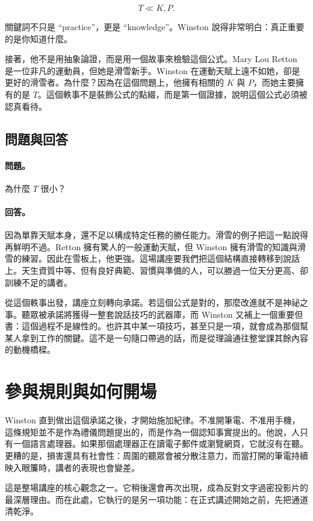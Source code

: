\begin{equation}
T \ll K,P.
\end{equation}

關鍵詞不只是 ``practice''，更是 ``knowledge''。Winston 說得非常明白：真正重要的是你知道什麼。

接著，他不是用抽象論證，而是用一個故事來檢驗這個公式。Mary Lou Retton 是一位非凡的運動員，但她是滑雪新手。Winston 在運動天賦上遠不如她，卻是更好的滑雪者。為什麼？因為在這個問題上，他擁有相關的 \(K\) 與 \(P\)，而她主要擁有的是 \(T\)。這個軼事不是裝飾公式的點綴，而是第一個證據，說明這個公式必須被認真看待。

\subsection{問題與回答}

\paragraph{問題。} 為什麼 \(T\) 很小？

\paragraph{回答。} 因為單靠天賦本身，還不足以構成特定任務的勝任能力。滑雪的例子把這一點說得再鮮明不過。Retton 擁有驚人的一般運動天賦，但 Winston 擁有滑雪的知識與滑雪的練習。因此在雪板上，他更強。這場講座要我們把這個結構直接轉移到說話上。天生資質中等、但有良好典範、習慣與準備的人，可以勝過一位天分更高、卻訓練不足的講者。

從這個軼事出發，講座立刻轉向承諾。若這個公式是對的，那麼改進就不是神祕之事。聽眾被承諾將獲得一整套說話技巧的武器庫，而 Winston 又補上一個重要但書：這個過程不是線性的。也許其中某一項技巧，甚至只是一項，就會成為那個幫某人拿到工作的關鍵。這不是一句隨口帶過的話，而是從理論通往整堂課其餘內容的動機橋樑。

\section{參與規則與如何開場}

Winston 直到做出這個承諾之後，才開始施加紀律。不准開筆電、不准用手機，這條規矩並不是作為禮儀問題提出的，而是作為一個認知事實提出的。他說，人只有一個語言處理器。如果那個處理器正在讀電子郵件或瀏覽網頁，它就沒有在聽。更糟的是，損害還具有社會性：周圍的聽眾會被分散注意力，而當打開的筆電持續映入眼簾時，講者的表現也會變差。

這是整場講座的核心觀念之一。它稍後還會再次出現，成為反對文字過密投影片的最深層理由。而在此處，它執行的是另一項功能：在正式講述開始之前，先把通道清乾淨。

